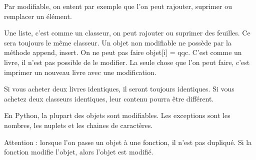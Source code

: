 \documentclass[letterpaper,10pt,english]{sphinxhowto}
\begin{document}
\sphinxAtStartPar
Par modifiable, on entent par exemple que l’on peut rajouter, suprimer ou remplacer un élément.

\begin{sphinxVerbatim}[commandchars=\\\{\}]
  \PYG{p}{[}\PYG{p}{]}
 
 \PYG{p}{[}\PYG{p}{]}
\PYG{p}{[}\PYG{p}{]}  
\end{sphinxVerbatim}

\begin{sphinxVerbatim}
\end{sphinxVerbatim}

\sphinxAtStartPar
Une liste, c’est comme un classeur, on peut rajouter ou suprimer des feuilles. Ce sera toujours le même classeur. Un objet non modifiable ne possède par la méthode append, insert. On ne peut pas faire objet{[}i{]} = qqc. C’est comme un livre, il n’est pas possible de le modifier. La seule chose que l’on peut faire, c’est imprimer un nouveau livre avec une modification.

\sphinxAtStartPar
Si vous acheter deux livres identiques, il seront toujours identiques. Si vous achetez deux classeurs identiques, leur contenu pourra être différent.

\sphinxAtStartPar
En Python, la plupart des objets sont modifiables. Les exceptions sont les nombres, les n\sphinxhyphen{}uplets et les chaines de caractères.

\sphinxAtStartPar
Attention : lorsque l’on passe un objet à une fonction, il n’est pas dupliqué. Si la fonction modifie l’objet, alors l’objet est modifié.

\begin{sphinxVerbatim}[commandchars=\\\{\}]
 

  \PYG{p}{[} \PYG{p}{]}
  
\end{sphinxVerbatim}
\end{document}

